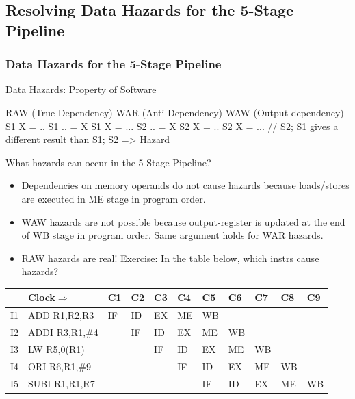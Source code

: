 \documentclass{beamer}
\renewcommand{\emph}[1]{\textcolor{structure}{#1}}
\begin{document}
\subsection{Resolving Data Hazards for the 5-Stage Pipeline}

\begin{frame}[fragile,t]
\frametitle{Data Hazards for the 5-Stage Pipeline}

\begin{block}{Data Hazards: Property of Software}
\begin{colorcode}
RAW (True Dependency)    WAR (Anti Dependency)    WAW (Output dependency)
S1    X  = ..            S1    .. = X             S1    X = ...            
S2    .. = X             S2    X  = ..            S2    X = ...
// S2; S1 gives a different result than S1; S2 => Hazard
\end{colorcode}
\end{block} 
\bigskip
\begin{scriptsize}
What hazards can occur in the 5-Stage Pipeline?
\begin{itemize}
\item \emph{Dependencies on memory operands} do not cause hazards 
        because loads/stores are executed in ME stage in program order.\smallskip
\item \emph{WAW hazards} are not possible because output-register is updated
        at the end of WB stage in program order. Same argument
        holds for \emph{WAR hazards}.\smallskip
\item \alert{RAW hazards are real!} Exercise: In the table below, which instrs cause hazards?
\end{itemize}
\end{scriptsize}
\bigskip
\begin{scriptsize}
\begin{tabular}{lllllllllll}
\hline
   & Clock$\Rightarrow$ & C1 & C2 & C3 & C4 & C5 & C6 & C7 & C8 & C9 \\\hline
I1 & ADD  R1,R2,R3      & IF & ID & EX & ME & WB &    &    &    &    \\
I2 & ADDI R3,R1,\#4     &    & IF & ID & EX & ME & WB &    &    &    \\
I3 & LW   R5,0(R1)      &    &    & IF & ID & EX & ME & WB &    &    \\
I4 & ORI  R6,R1,\#9     &    &    &    & IF & ID & EX & ME & WB &    \\
I5 & SUBI R1,R1,R7      &    &    &    &    & IF & ID & EX & ME & WB \\\hline
\end{tabular}
\end{scriptsize} 

\end{frame}
\end{document}
